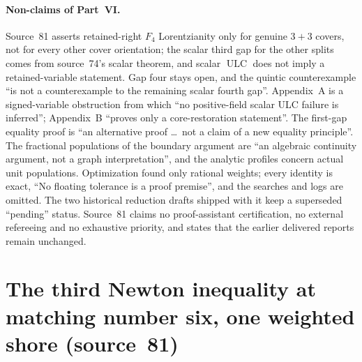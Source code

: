 \documentclass[11pt,a4paper]{article}
\theoremstyle{remark}\newtheorem{remark}[theorem]{Remark}
\newcommand{\ULC}{\operatorname{ULC}}      %
\begin{document}
\paragraph{Non-claims of Part~VI.}
Source~81 asserts retained-right $F_4$ Lorentzianity only for genuine $3+3$
covers, not for every other cover orientation; the scalar third gap for the
other splits comes from source~74's scalar theorem, and scalar $\ULC$ does
not imply a retained-variable statement. Gap four stays open, and the
quintic counterexample ``is not a counterexample to the remaining scalar
fourth gap''. Appendix~A is a signed-variable obstruction from which ``no
positive-field scalar ULC failure is inferred''; Appendix~B ``proves only a
core-restoration statement''. The first-gap equality proof is ``an
alternative proof \dots\ not a claim of a new equality principle''. The
fractional populations of the boundary argument are ``an algebraic continuity
argument, not a graph interpretation'', and the analytic profiles concern
actual unit populations. Optimization found only rational weights; every
identity is exact, ``No floating tolerance is a proof premise'', and the
searches and logs are omitted. The two historical reduction drafts shipped
with it keep a superseded ``pending'' status. Source~81 claims no
proof-assistant certification, no external refereeing and no exhaustive
priority, and states that the earlier delivered reports remain unchanged.

\section{The third Newton inequality at matching number six, one weighted shore (source~81)}\label{mrn:src:81}
\end{document}
